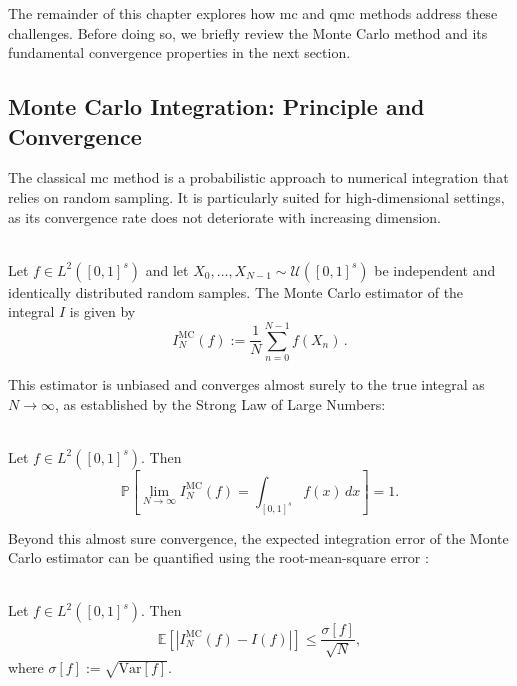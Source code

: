 The remainder of this chapter explores how \ac{mc} and \ac{qmc} methods address
these challenges. Before doing so, we briefly review the Monte Carlo method and
its fundamental convergence properties in the next section.


\subsection{Monte Carlo Integration: Principle and Convergence}
The classical \ac{mc} method is a probabilistic approach to numerical
integration that relies on random sampling. It is particularly suited for
high-dimensional settings, as its convergence rate does not deteriorate with
increasing dimension.

\begin{definition} \ \\
Let $f \in L^2([0,1]^s)$ and let $X_0, \dots, X_{N-1} \sim
\mathcal{U}([0,1]^s)$ be independent and identically distributed random samples.
The Monte Carlo estimator of the integral \( I \) is given by
\begin{equation}
    I_N^{\mathrm{MC}}(f) := \frac{1}{N} \sum_{n=0}^{N-1} f(X_n)\,.
\end{equation}
\end{definition}


This estimator is unbiased and converges almost surely to the true integral as $N \to \infty$, as established by the Strong Law of Large Numbers:

\begin{theorem} \ \\
Let $f \in L^2([0,1]^s)$. Then
\begin{equation}
\mathbb{P}\left[ \lim_{N \to \infty} I_N^{\mathrm{MC}}(f) = \int_{[0,1]^s} f(x)\, dx \right] = 1.
\end{equation}
\end{theorem}

Beyond this almost sure convergence, the expected integration error of the Monte
Carlo estimator can be quantified using the root-mean-square error \cite[Section 1.3]{pillichshammer2010zahlentheoretische}:

\begin{theorem} \ \\
\label{thm:mc-convergence-rate}
Let $f \in L^2([0,1]^s)$. Then
\begin{equation}
    \mathbb{E}\left[ \left| I_N^{\mathrm{MC}}(f) - I(f) \right| \right] \leq \frac{\sigma[f]}{\sqrt{N}},
\end{equation}
where $\sigma[f] := \sqrt{\mathrm{Var}[f]}$.
\end{theorem}


